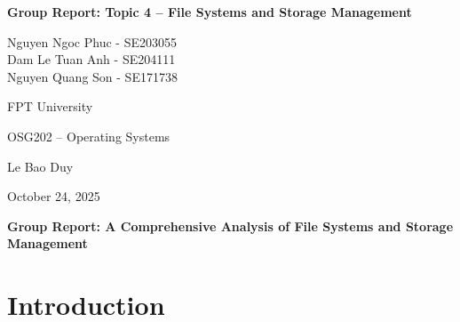 \documentclass[12pt]{article}
\begin{document}
\begin{titlepage}
    \thispagestyle{fancy} %
    \centering
    
    \vspace*{3\baselineskip} %
    
    {\Large \bfseries Group Report: Topic 4 – File Systems and Storage Management\par}
    
    \vspace{2\baselineskip} %
    
    {\large
        Nguyen Ngoc Phuc - SE203055 \\
        Dam Le Tuan Anh - SE204111\\
        Nguyen Quang Son - SE171738\\
    }
    
    
    {\large FPT University\par} %
    
    
    {\large OSG202 – Operating Systems\par}
    
    
    {\large Le Bao Duy\par}
    
    
    {\large October 24, 2025\par}
    
\end{titlepage}

\onehalfspacing 

\tableofcontents
\newpage


\begin{center}
    \large \bfseries Group Report: A Comprehensive Analysis of File Systems and Storage Management
\end{center}
\vspace{1\baselineskip} %

\section{Introduction}
\end{document}

